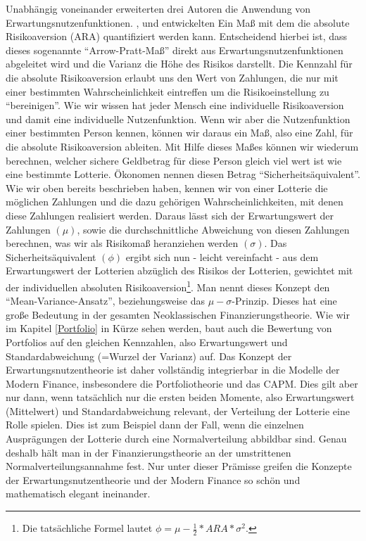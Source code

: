 Unabhängig voneinander erweiterten drei Autoren die Anwendung von Erwartungsnutzenfunktionen. \textcite{DeFinetti1952}, \textcite{Arrow1963b} und \textcite{Pratt1964} entwickelten Ein Maß mit dem die absolute Risikoaversion (ARA) quantifiziert werden kann. Entscheidend hierbei ist, dass dieses sogenannte "`Arrow-Pratt-Maß"' direkt aus Erwartungsnutzenfunktionen abgeleitet wird und die Varianz die Höhe des Risikos darstellt. Die Kennzahl für die absolute Risikoaversion erlaubt uns den Wert von Zahlungen, die nur mit einer bestimmten Wahrscheinlichkeit eintreffen um die Risikoeinstellung zu "`bereinigen"'. Wie wir wissen hat jeder Mensch eine individuelle Risikoaversion und damit eine individuelle Nutzenfunktion. Wenn wir aber die Nutzenfunktion einer bestimmten Person kennen, können wir daraus ein Maß, also eine Zahl, für die absolute Risikoaversion ableiten. Mit Hilfe dieses Maßes können wir wiederum berechnen, welcher sichere Geldbetrag für diese Person gleich viel wert ist wie eine bestimmte Lotterie. Ökonomen nennen diesen Betrag "`Sicherheitsäquivalent"'. Wie wir oben bereits beschrieben haben, kennen wir von einer Lotterie die möglichen Zahlungen und die dazu gehörigen Wahrscheinlichkeiten, mit denen diese Zahlungen realisiert werden. Daraus lässt sich der Erwartungswert der Zahlungen $(\mu)$, sowie die durchschnittliche Abweichung von diesen Zahlungen berechnen, was wir als Risikomaß heranziehen werden $(\sigma)$. Das Sicherheitsäquivalent $(\phi)$ ergibt sich nun - leicht vereinfacht - aus dem Erwartungswert der Lotterien abzüglich des Risikos der Lotterien, gewichtet mit der individuellen absoluten Risikoaversion\footnote{Die tatsächliche Formel lautet $\phi = \mu - \frac{1}{2}*ARA*\sigma^2$.}. Man nennt dieses Konzept den "`Mean-Variance-Ansatz"', beziehungsweise das $\mu-\sigma$-Prinzip. Dieses hat eine große Bedeutung in der gesamten Neoklassischen Finanzierungstheorie. Wie wir im Kapitel \ref{Portfolio} in Kürze sehen werden, baut auch die Bewertung von Portfolios auf den gleichen Kennzahlen, also Erwartungswert und Standardabweichung (=Wurzel der Varianz) auf. Das Konzept der Erwartungsnutzentheorie ist daher vollständig integrierbar in die Modelle der Modern Finance, insbesondere die Portfoliotheorie und das CAPM. Dies gilt aber nur dann, wenn tatsächlich nur die ersten beiden Momente, also Erwartungswert (Mittelwert) und Standardabweichung relevant, der Verteilung der Lotterie eine Rolle spielen. Dies ist zum Beispiel dann der Fall, wenn die einzelnen Ausprägungen der Lotterie durch eine Normalverteilung abbildbar sind. Genau deshalb hält man in der Finanzierungstheorie an der umstrittenen Normalverteilungsannahme fest. Nur unter dieser Prämisse greifen die Konzepte der Erwartungsnutzentheorie und der Modern Finance so schön und mathematisch elegant ineinander.


